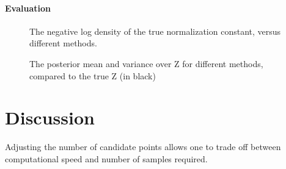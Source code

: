 \documentclass{article}
\begin{document}
\paragraph{Evaluation}

% 
% 
% 
% 

\begin{figure}
	\centering
	\caption{The negative log density of the true normalization constant, versus different methods.}
\end{figure}

\begin{figure}
	\centering
	\caption{The posterior mean and variance over Z for different methods, compared to the true Z (in black)}
\end{figure}




\section{Discussion}

Adjusting the number of candidate points allows one to trade off between computational speed and number of samples required.
\end{document}
